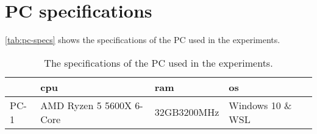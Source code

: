 \chapter{PC specifications}\label{cha:pc-specs}
\autoref{tab:pc-specs} shows the specifications of the PC used in the experiments.

\begin{table}[htb!]
    \centering
    \begin{tabular}{llll}
        \toprule
             & \gls{cpu}                & \acs{ram}   & \acs{os}          \\
        \midrule
        PC-1 & AMD Ryzen 5 5600X 6-Core & 32GB3200MHz & Windows 10 \& WSL \\
        \bottomrule
    \end{tabular}
    \caption{The specifications of the PC used in the experiments.}
    \label{tab:pc-specs}
\end{table}